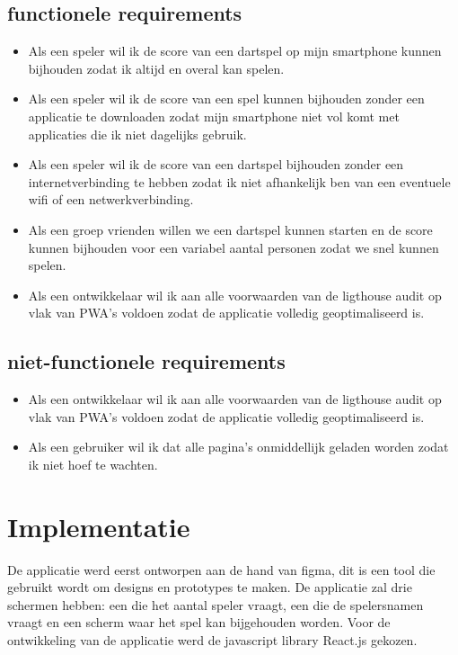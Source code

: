 	\subsection{functionele requirements}
		\begin{itemize}
			 \item 	Als een speler wil ik de score van een dartspel op mijn smartphone kunnen bijhouden zodat ik altijd en overal kan spelen.
			 \item 	Als een speler wil ik de score van een spel kunnen bijhouden zonder een applicatie te downloaden zodat mijn smartphone niet vol komt met applicaties die ik niet dagelijks gebruik.
			 \item 	Als een speler wil ik de score van een dartspel bijhouden zonder een internetverbinding te hebben zodat ik niet afhankelijk ben van een eventuele wifi of een netwerkverbinding.
			 \item 	Als een groep vrienden willen we een dartspel kunnen starten en de score kunnen bijhouden voor een variabel aantal personen zodat we snel kunnen spelen.
			 \item Als een ontwikkelaar wil ik aan alle voorwaarden van de ligthouse audit op vlak van PWA's voldoen zodat de applicatie volledig geoptimaliseerd is.
		\end{itemize}	
	
	\subsection{niet-functionele requirements}
		\begin{itemize}
			 \item Als een ontwikkelaar wil ik aan alle voorwaarden van de ligthouse audit op vlak van PWA's voldoen zodat de applicatie volledig geoptimaliseerd is.
			 \item Als een gebruiker wil ik dat alle pagina's onmiddellijk geladen worden zodat ik niet hoef te wachten.
		\end{itemize}	


\section{Implementatie}

	De applicatie werd eerst ontworpen aan de hand van figma, dit is een tool die gebruikt wordt om designs en prototypes te maken. De applicatie zal drie schermen hebben: een die het aantal speler vraagt, een die de spelersnamen vraagt en een scherm waar het spel kan bijgehouden worden. 
	Voor de ontwikkeling van de applicatie werd de javascript library React.js gekozen.

